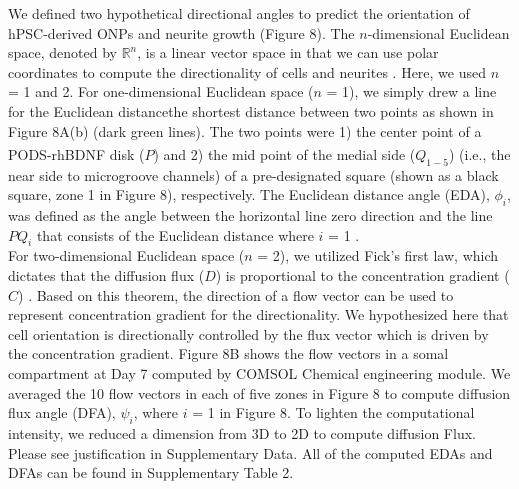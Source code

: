 \documentclass[review]{elsarticle}
\begin{document}
\indent We defined two hypothetical directional angles to predict the orientation of hPSC-derived ONPs and neurite growth (Figure 8). The $n$-dimensional Euclidean space, denoted by $\mathbb{R}^{n}$, is a linear vector space in that we can use polar coordinates to compute the directionality of cells and neurites \cite{Axler2015}. Here, we used $n$ = 1 and 2. For one-dimensional Euclidean space ($n$ = 1), we simply drew a line for the Euclidean distance\textemdash the shortest distance between two points as shown in Figure 8A(b) (dark green lines).  The two points were 1) the center point of a PODS\textsuperscript{\textregistered}-rhBDNF disk ($P$) and 2) the mid point of the medial side ($Q_{1-5}$) (i.e., the near side to microgroove channels) of a pre-designated square (shown as a black square, zone 1 in Figure 8), respectively. The Euclidean distance angle (EDA), $\phi_{i}$, was defined as the angle between the horizontal line zero direction and the line $PQ_{i}$ that consists of the Euclidean distance where $i$ = 1 .\\
\indent For two-dimensional Euclidean space ($n$ = 2), we utilized Fick's first law, which dictates that the diffusion flux ($D$) is proportional to the concentration gradient ($C$) \cite{crank1979}. Based on this theorem, the direction of a flow vector can be used to represent concentration gradient for the directionality. We hypothesized here that cell orientation is directionally controlled by the flux vector which is driven by the concentration gradient. Figure 8B shows the flow vectors in a somal compartment at Day 7 computed by COMSOL Chemical engineering module.  We averaged the 10 flow vectors in each of five zones in Figure 8 to compute diffusion flux angle (DFA), $\psi_{i}$, where $i$ = 1 in Figure 8. To lighten the computational intensity, we reduced a dimension from 3D to 2D to compute diffusion Flux. Please see justification in Supplementary Data. All of the computed EDAs and DFAs can be found in Supplementary Table 2. 
\end{document}
